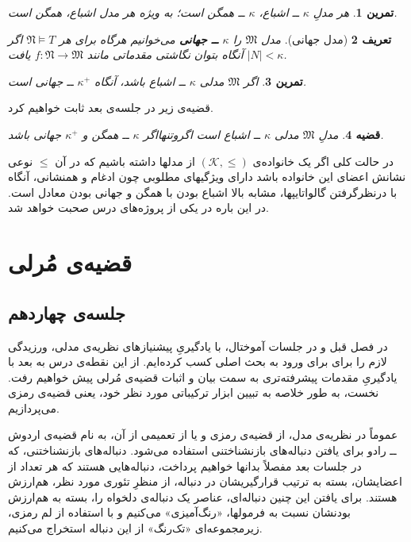 \documentclass[12pt,a4paper]{report}
\theoremstyle{colorhead}
\newtheorem{thm}{قضیه}
\newtheorem{tam}[thm]{تمرین}
\newtheorem{defn}[thm]{تعریف}
\begin{document}
\begin{tam}
هر مدلِ
$\kappa$
ــ
اشباع،
$\kappa$
ــ
همگن است؛ به ویژه هر مدل اشباع، همگن است.
\end{tam}
\begin{defn}[مدل جهانی]
مدل
$\mathfrak{M}$
را
\textbf{$\kappa$
ــ
جهانی }
می‌خوانیم هرگاه برای هر
$\mathfrak{N}\models T$
اگر
$|N|<\kappa$
آنگاه بتوان نگاشتی مقدماتی مانند
$f:\mathfrak{N}\to \mathfrak{M}$
یافت.
\end{defn}
\begin{tam}
اگر
$\mathfrak{M}$
مدلی
$\kappa$ ــ
اشباع باشد، آنگاه 
$\kappa^+$
ــ 
جهانی است.
\end{tam}
قضیه‌ی زیر در جلسه‌ی بعد ثابت خواهیم کرد.
\begin{thm}
مدلِ
$\mathfrak{M}$
مدلی
$\kappa$ ــ
اشباع است اگروتنهااگر
$\kappa$
ــ
همگن و 
$\kappa^+$
جهانی باشد.
\end{thm}
در حالت کلی اگر یک
خانواده‌ی
$(\mathcal{K},\leq)$
از مدلها
داشته باشیم که در آن
$\leq$
نوعی نشانش اعضای این خانواده باشد دارای ویژگیهای مطلوبی چون ادغام و  همنشانی،
آنگاه با درنظرگرفتن
گالواتایپها،   مشابه بالا 
اشباع بودن با همگن و جهانی بودن معادل است. در این باره در یکی از پروژه‌های درس صحبت خواهد شد. 
\chapter{قضیه‌ی مُرلی}
\section{جلسه‌ی چهاردهم}
در فصل قبل 
و در جلسات آموختال،
با یادگیریِ پیشنیازهای نظریه‌ی مدلی، ورزیدگی لازم  را برای 
برای ورود به بحث اصلی کسب کرده‌ایم. 
از این نقطه‌ی درس به بعد با یادگیریِ 
مقدمات پیشرفته‌تری به سمت بیان و
اثبات قضیه‌ی مُرلی پیش خواهیم رفت.  نخست، به طور خلاصه به تبیین  ابزار ترکیباتی مورد نظر خود، یعنی قضیه‌ی رمزی می‌پردازیم.
\par 
عموماً در نظریه‌ی مدل، از قضیه‌ی رمزی
 و یا از تعمیمی از آن، به نام قضیه‌ی اردوش ــ‌ رادو
 برای یافتن دنباله‌های بازنشناختنی استفاده می‌شود. دنباله‌های بازنشناختنی، که در جلسات بعد مفصلاً  بدانها خواهیم پرداخت، دنباله‌هایی هستند که هر تعداد از اعضایشان، بسته به ترتیب 
 قرارگیریشان در دنباله،
از منظرِ تئوری مورد نظر، هم‌ارزش هستند. برای  یافتن این چنین دنباله‌ای، 
 عناصر یک دنباله‌ی دلخواه را،‌ بسته‌ به هم‌ارزش بودنشان نسبت به فرمولها، «رنگ‌آمیزی» می‌کنیم و با استفاده از لم‌ رمزی، زیرمجموعه‌ای «تک‌رنگ» از این دنباله استخراج می‌کنیم. 
\end{document}
